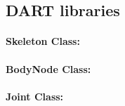 \subsection{DART libraries}

\paragraph{Skeleton Class:}

\paragraph{BodyNode Class:}

\paragraph{Joint Class:}
